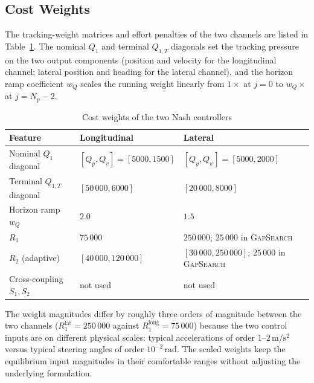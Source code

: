 \documentclass[12pt,a4paper,oneside]{report}
\begin{document}
\subsection{Cost Weights}

The tracking-weight matrices and effort penalties of the two channels are listed in Table~\ref{tab:comparison_cost}. The nominal $Q_1$ and terminal $Q_{1,T}$ diagonals set the tracking pressure on the two output components (position and velocity for the longitudinal channel; lateral position and heading for the lateral channel), and the horizon ramp coefficient $w_Q$ scales the running weight linearly from $1\times$ at $j=0$ to $w_Q \times$ at $j = N_p - 2$.

\begin{table}[H]
\centering
\footnotesize
\setlength{\tabcolsep}{4pt}
\renewcommand{\arraystretch}{1.2}
\begin{tabularx}{\textwidth}{|l|X|X|}
\hline
\textbf{Feature} & \textbf{Longitudinal} & \textbf{Lateral} \\
\hline
Nominal $Q_1$ diagonal                       & $[Q_p, Q_v] = [5000, 1500]$                     & $[Q_y, Q_\psi] = [5000, 2000]$        \\
Terminal $Q_{1,T}$ diagonal                  & $[50\,000, 6000]$                               & $[20\,000, 8000]$                     \\
Horizon ramp $w_Q$                           & $2.0$                                           & $1.5$                                  \\
$R_1$                                        & $75\,000$                                       & $250\,000$; $25\,000$ in \textsc{GapSearch} \\
$R_2$ (adaptive)                             & $[40\,000, 120\,000]$                           & $[30\,000, 250\,000]$; $25\,000$ in \textsc{GapSearch} \\
Cross-coupling $S_1, S_2$                    & not used                                        & not used                               \\
\hline
\end{tabularx}
\caption{Cost weights of the two Nash controllers}
\label{tab:comparison_cost}
\end{table}

The weight magnitudes differ by roughly three orders of magnitude between the two channels ($R_1^{\text{lat}} = 250\,000$ against $R_1^{\text{long}} = 75\,000$) because the two control inputs are on different physical scales: typical accelerations of order $1$--$2\,\mathrm{m/s^2}$ versus typical steering angles of order $10^{-2}\,\mathrm{rad}$. The scaled weights keep the equilibrium input magnitudes in their comfortable ranges without adjusting the underlying formulation.
\end{document}
